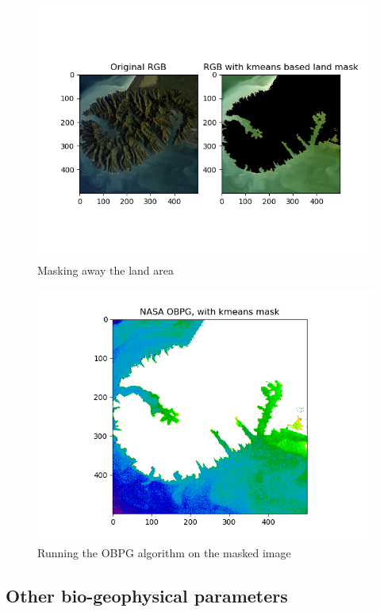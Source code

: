 \begin{figure}
    \centering
    \includegraphics[width=\textwidth]{../fig/rgb_masked.png}
    \caption{Masking away the land area}
    \label{fig:mask_rgb}
\end{figure}

\begin{figure}
    \centering
    \includegraphics[width=\textwidth]{../fig/NASA OBPG, with kmeans mask.png}
    \caption{Running the OBPG algorithm on the masked image}
    \label{fig:mask_obpg}
\end{figure}

\subsection{Other bio-geophysical parameters}

